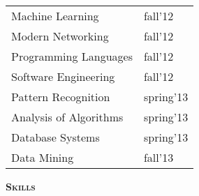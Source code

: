 \documentclass[10pt,a4paper,oneside]{article}
\begin{document}
    \begin{adjustwidth}{7pt}{0pt}
        \begin{tabular}{ll}
            { \footnotesize Machine Learning } & {\footnotesize fall'12}\\                
            { \footnotesize Modern Networking } & {\footnotesize fall'12}\\
            { \footnotesize Programming Languages } & {\footnotesize fall'12}\\
            { \footnotesize Software Engineering } & {\footnotesize fall'12}\\
            { \footnotesize Pattern Recognition } & {\footnotesize spring'13}\\
            { \footnotesize Analysis of Algorithms } & {\footnotesize spring'13}\\
            { \footnotesize Database Systems } & {\footnotesize spring'13}\\
            { \footnotesize Data Mining } & {\footnotesize fall'13}\\
        \end{tabular}
    \end{adjustwidth}
    \vspace{10pt}
    \textcolor{light-gray}{\textbf{\large S\textsc{kills}}}
    \vspace{10pt}\\
\end{document}
